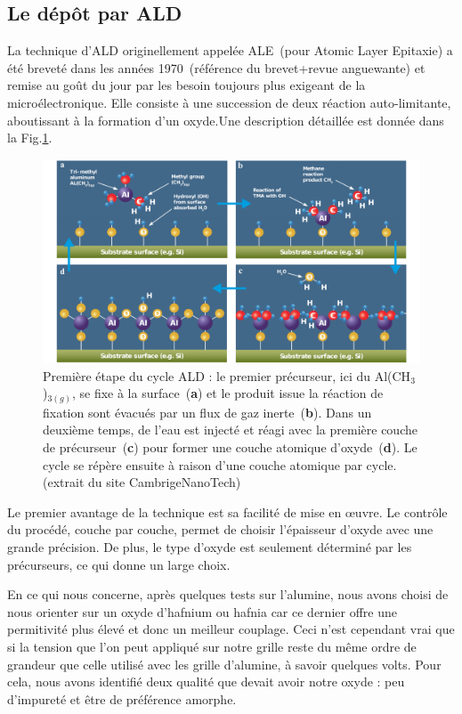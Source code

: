 \subsection{Le dép\^ot par ALD}
La technique d'ALD originellement appelée ALE~(pour Atomic Layer Epitaxie) a été breveté dans les années 1970~(référence du brevet+revue anguewante) et remise au goût du jour par les besoin toujours plus exigeant de la microélectronique. Elle consiste à une succession de deux réaction auto-limitante, aboutissant à la formation d'un oxyde.Une description détaillée est donnée dans la Fig.\ref{ALD}.

\begin{figure}
\centering \includegraphics[scale=0.45]{Fabrication/ALD/ALD.pdf}
\caption{Première étape du cycle ALD : le premier précurseur, ici du Al(CH$_3$)$_{3(g)}$, se fixe à la surface~(\textbf{a}) et le produit issue la réaction de fixation sont évacués par un flux de gaz inerte~(\textbf{b}). Dans un deuxième temps, de l'eau est injecté et réagi avec la première couche de précurseur~(\textbf{c}) pour former une couche atomique d'oxyde~(\textbf{d}). Le cycle se répère ensuite à raison d'une couche atomique par cycle. (extrait du site CambrigeNanoTech)}
\label{ALD}
\end{figure}


Le premier avantage de la technique est sa facilité de mise en œuvre. Le contrôle du procédé, couche par couche, permet de choisir l'épaisseur d'oxyde avec une grande précision. De plus, le type d'oxyde est seulement déterminé par les précurseurs, ce qui donne un large choix.

En ce qui nous concerne, après quelques tests sur l'alumine, nous avons choisi de nous orienter sur un oxyde d'hafnium ou hafnia car ce dernier offre une permitivité plus élevé et donc un meilleur couplage. Ceci n'est cependant vrai que si la tension que l'on peut appliqué sur notre grille reste du même ordre de grandeur que celle utilisé avec les grille d'alumine, à savoir quelques volts. Pour cela, nous avons identifié deux qualité que devait avoir notre oxyde : peu d'impureté et être de préférence amorphe. 

